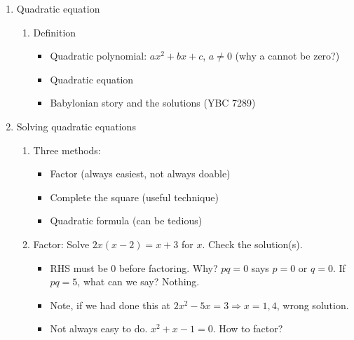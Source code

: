 \documentclass{article}
\begin{document}
\begin{enumerate}

\item Quadratic equation
\begin{enumerate}
\item Definition
\begin{itemize}
\item Quadratic polynomial: $ax^2+bx+c$, $a\neq 0$ (why a cannot be zero?)
\item Quadratic equation
\item Babylonian story and the solutions (YBC 7289)
\end{itemize}
\end{enumerate}

\item Solving quadratic equations
\begin{enumerate}
\item Three methods:
\begin{itemize}
\item Factor (always easiest, not always doable)
\item Complete the square (useful technique)
\item Quadratic formula (can be tedious)
\end{itemize}

\item Factor: Solve $2x(x-2)=x+3$ for $x$. Check the solution(s). 
\begin{itemize}
\item RHS must be 0 before factoring. Why? $pq=0$ says $p=0$ or $q=0$. If $pq=5$, what can we say? Nothing. 
\item Note, if we had done this at $2x^2-5x=3 \Rightarrow x=1,4$, wrong solution. 
\item Not always easy to do. $x^2+x-1=0$. How to factor?
\end{itemize}


\end{enumerate}
\end{enumerate}
\end{document}
